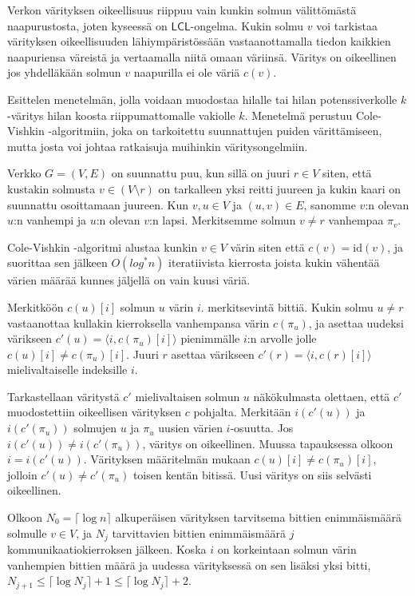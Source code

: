 \documentclass[12pt,finnish]{tktltiki2}
\theoremstyle{definition}
\theoremstyle{remark}
\newcommand*{\lcl}{\ensuremath{\mathsf{LCL}}}
\begin{document}
Verkon värityksen oikeellisuus riippuu vain kunkin solmun välittömästä naapurustosta, joten kyseessä on \lcl -ongelma. Kukin solmu $v$ voi tarkistaa värityksen oikeellisuuden lähiympäristössään vastaanottamalla tiedon kaikkien naapuriensa väreistä ja vertaamalla niitä omaan väriinsä. Väritys on oikeellinen jos yhdelläkään solmun $v$ naapurilla ei ole väriä $c(v)$.

Esittelen menetelmän, jolla voidaan muodostaa hilalle tai hilan potenssiverkolle $k$-väritys hilan koosta riippumattomalle vakiolle $k$. Menetelmä perustuu Cole-Vishkin -algoritmiin, joka on tarkoitettu suunnattujen puiden värittämiseen, mutta josta voi johtaa ratkaisuja muihinkin väritysongelmiin.

Verkko $G = (V, E)$ on suunnattu puu, kun sillä on juuri $r \in V$ siten, että kustakin solmusta $v \in (V \setminus r)$ on tarkalleen yksi reitti juureen ja kukin kaari on suunnattu osoittamaan juureen. Kun $v, u \in V$ ja $(u, v) \in E$, sanomme $v$:n olevan $u$:n vanhempi ja $u$:n olevan $v$:n lapsi. Merkitsemme solmun $v \neq r$ vanhempaa $\pi_v$. 

Cole-Vishkin -algoritmi alustaa kunkin $v \in V$ värin siten että $c(v) = \text{id}(v)$, ja suorittaa sen jälkeen $O(log^* n)$ iteratiivista kierrosta joista kukin vähentää värien määrää kunnes jäljellä on vain kuusi väriä.

Merkitköön $c(u)[i]$ solmun $u$ värin $i.$ merkitsevintä bittiä. Kukin solmu $u \neq r$ vastaanottaa kullakin kierroksella vanhempansa värin $c(\pi_u)$, ja asettaa uudeksi värikseen $c'(u) = \langle i, c(\pi_u)[i] \rangle$ pienimmälle $i$:n arvolle jolle $c(u)[i] \neq c(\pi_u)[i]$. Juuri $r$ asettaa värikseen $c'(r) = \langle i, c(r)[i] \rangle$ mielivaltaiselle indeksille $i$. 

Tarkastellaan väritystä $c'$ mielivaltaisen solmun $u$ näkökulmasta olettaen, että $c'$ muodostettiin oikeellisen värityksen $c$ pohjalta. Merkitään $i(c'(u))$ ja $i(c'(\pi_u))$ solmujen $u$ ja $\pi_u$ uusien värien $i$-osuutta. Jos $i(c'(u)) \neq i(c'(\pi_u))$, väritys on oikeellinen. Muussa tapauksessa olkoon $i = i(c'(u))$. Värityksen määritelmän mukaan $c(u)[i] \neq c(\pi_u)[i]$, jolloin $c'(u) \neq c'(\pi_u)$ toisen kentän bitissä. Uusi väritys on siis selvästi oikeellinen.

Olkoon $N_0 = \lceil{\log n}\rceil$ alkuperäisen värityksen tarvitsema bittien enimmäismäärä solmulle $v \in V$, ja $N_j$ tarvittavien bittien enimmäismäärä $j$ kommunikaatiokierroksen jälkeen. Koska $i$ on korkeintaan solmun värin vanhempien bittien määrä ja uudessa värityksessä on sen lisäksi yksi bitti, $N_{j+1} \leq \lceil \log N_j \rceil + 1 \leq \lceil \log N_j \rceil + 2$.
\end{document}
